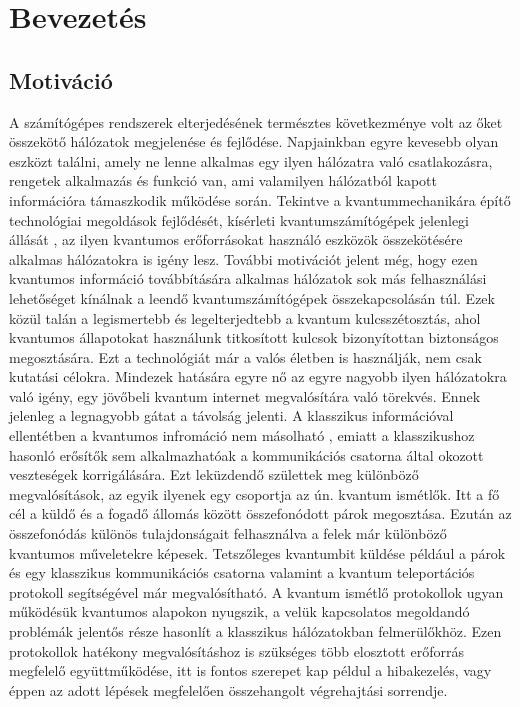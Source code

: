 \chapter{Bevezetés}

\section{Motiváció}

A számítógépes rendszerek elterjedésének természtes következménye volt az őket összekötő hálózatok megjelenése és fejlődése. Napjainkban egyre kevesebb olyan eszközt találni, amely ne lenne alkalmas egy ilyen hálózatra való csatlakozásra, rengetek alkalmazás és funkció van, ami valamilyen hálózatból kapott információra támaszkodik működése során. Tekintve a kvantummechanikára építő technológiai megoldások fejlődését, kísérleti kvantumszámítógépek jelenlegi állását\cite{IBMQC}\cite{neill2017blueprint} , az ilyen kvantumos erőforrásokat használó eszközök összekötésére alkalmas hálózatokra is igény lesz. További motivációt jelent még, hogy ezen kvantumos információ továbbítására alkalmas hálózatok sok más felhasználási lehetőséget kínálnak a leendő kvantumszámítógépek összekapcsolásán túl. Ezek közül talán a legismertebb és legelterjedtebb a kvantum kulcsszétosztás, ahol kvantumos állapotokat használunk titkosított kulcsok bizonyítottan biztonságos megosztására.\cite{BB84} Ezt a technológiát már a valós életben is használják, nem csak kutatási célokra.\cite{Swisselection} Mindezek hatására egyre nő az egyre nagyobb ilyen hálózatokra való igény, egy jövőbeli kvantum internet\cite{kimble2008quantum} megvalósítára való törekvés. Ennek jelenleg a legnagyobb gátat a távolság jelenti. A klasszikus információval ellentétben a kvantumos infromáció nem másolható \cite{wootters1982single}, emiatt a klasszikushoz hasonló erősítők sem alkalmazhatóak a kommunikációs csatorna által okozott veszteségek korrigálására. Ezt leküzdendő születtek meg különböző megvalósítások, az egyik ilyenek egy csoportja az ún. kvantum ismétlők. Itt a fő cél a küldő és a fogadő állomás között összefonódott párok megosztása. Ezután az összefonódás különös tulajdonságait felhasználva a felek már különböző kvantumos műveletekre képesek. Tetszőleges kvantumbit küldése például a párok és egy klasszikus kommunikációs csatorna valamint a kvantum teleportációs protokoll\cite{bennett1993teleporting} segítségével már megvalósítható. A kvantum ismétlő protokollok ugyan működésük kvantumos alapokon nyugszik, a velük kapcsolatos megoldandó problémák jelentős része hasonlít a klasszikus hálózatokban felmerülőkhöz. Ezen protokollok hatékony megvalósításhoz is szükséges több elosztott erőforrás megfelelő együttműködése, itt is fontos szerepet kap példul a hibakezelés, vagy éppen az adott lépések megfelelően összehangolt végrehajtási sorrendje. 

